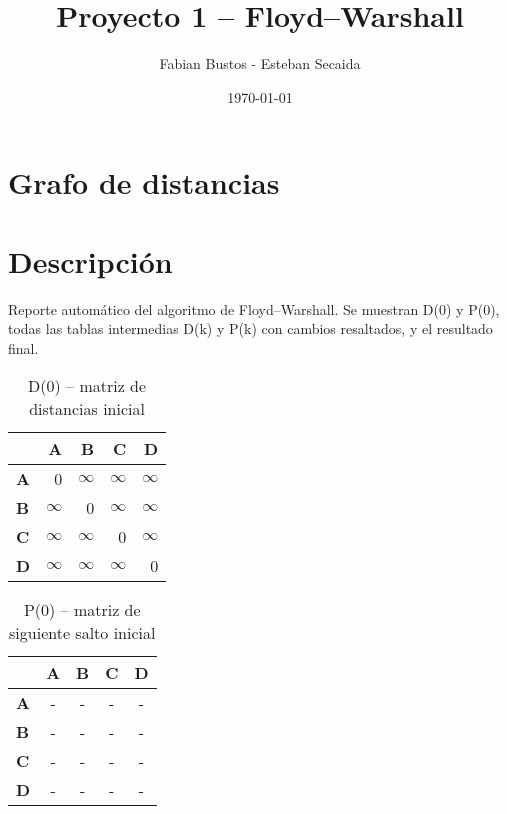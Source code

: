 \documentclass{article}
\title{Proyecto 1 – Floyd–Warshall}
\author{Fabian Bustos - Esteban Secaida}
\date{\today}
\newcommand{\INF}{$\infty$}
\begin{document}
\maketitle
\section*{Grafo de distancias}
\section*{Descripción}
Reporte automático del algoritmo de Floyd--Warshall. Se muestran D(0) y P(0), todas las tablas intermedias D(k) y P(k) con cambios resaltados, y el resultado final.

\begin{table}[H]\centering
\caption{D(0) -- matriz de distancias inicial}
\begin{tabular}{l r r r r}
\toprule
 & \textbf{A} & \textbf{B} & \textbf{C} & \textbf{D}\\\midrule
\textbf{A} & 0 & \INF & \INF & \INF \\
\textbf{B} & \INF & 0 & \INF & \INF \\
\textbf{C} & \INF & \INF & 0 & \INF \\
\textbf{D} & \INF & \INF & \INF & 0 \\
\bottomrule
\end{tabular}
\end{table}

\begin{table}[H]\centering
\caption{P(0) -- matriz de siguiente salto inicial}
\begin{tabular}{l c c c c}
\toprule
 & \textbf{A} & \textbf{B} & \textbf{C} & \textbf{D}\\\midrule
\textbf{A} & - & - & - & - \\
\textbf{B} & - & - & - & - \\
\textbf{C} & - & - & - & - \\
\textbf{D} & - & - & - & - \\
\bottomrule
\end{tabular}
\end{table}
\end{document}
